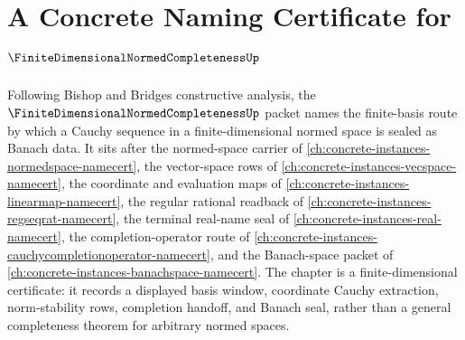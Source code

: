 \chapter{A Concrete Naming Certificate for $\FiniteDimensionalNormedCompletenessUp$}
\label{ch:concrete-instances-finite-dimensional-normed-completeness-namecert}

Following Bishop and Bridges constructive analysis, the $\FiniteDimensionalNormedCompletenessUp$ packet names the finite-basis route by which a Cauchy sequence in a finite-dimensional normed space is sealed as Banach data. It sits after the normed-space carrier of \autoref{ch:concrete-instances-normedspace-namecert}, the vector-space rows of \autoref{ch:concrete-instances-vecspace-namecert}, the coordinate and evaluation maps of \autoref{ch:concrete-instances-linearmap-namecert}, the regular rational readback of \autoref{ch:concrete-instances-regseqrat-namecert}, the terminal real-name seal of \autoref{ch:concrete-instances-real-namecert}, the completion-operator route of \autoref{ch:concrete-instances-cauchycompletionoperator-namecert}, and the Banach-space packet of \autoref{ch:concrete-instances-banachspace-namecert}. The chapter is a finite-dimensional certificate: it records a displayed basis window, coordinate Cauchy extraction, norm-stability rows, completion handoff, and Banach seal, rather than a general completeness theorem for arbitrary normed spaces.

